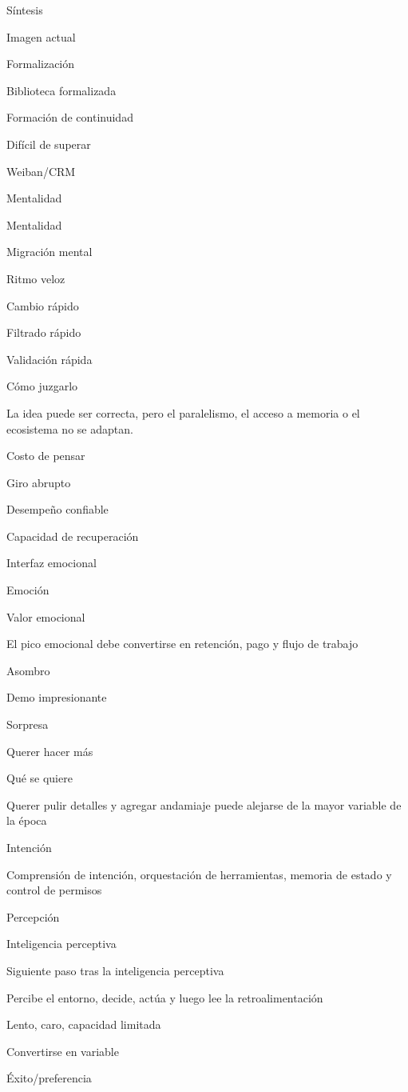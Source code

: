 \documentclass{article}
\begin{document}
Síntesis

Imagen actual

Formalización

Biblioteca formalizada

Formación de continuidad

Difícil de superar

Weiban/CRM

Mentalidad

Mentalidad

Migración mental

Ritmo veloz

Cambio rápido

Filtrado rápido

Validación rápida

Cómo juzgarlo

La idea puede ser correcta, pero el paralelismo, el acceso a memoria o el ecosistema no se adaptan.

Costo de pensar

Giro abrupto

Desempeño confiable

Capacidad de recuperación

Interfaz emocional

Emoción

Valor emocional

El pico emocional debe convertirse en retención, pago y flujo de trabajo

Asombro

Demo impresionante

Sorpresa

Querer hacer más

Qué se quiere

Querer pulir detalles y agregar andamiaje puede alejarse de la mayor variable de la época

Intención

Comprensión de intención, orquestación de herramientas, memoria de estado y control de permisos

Percepción

Inteligencia perceptiva

Siguiente paso tras la inteligencia perceptiva

Percibe el entorno, decide, actúa y luego lee la retroalimentación

Lento, caro, capacidad limitada

Convertirse en variable

Éxito/preferencia
\end{document}
